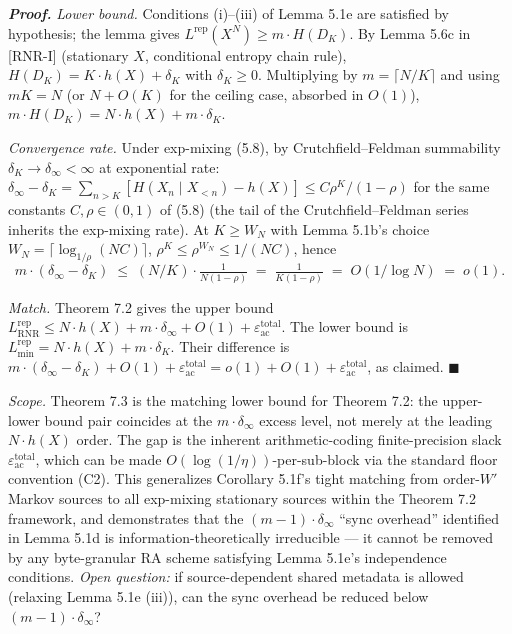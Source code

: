 \documentclass[
]{article}
\begin{document}
\emph{\textbf{Proof.}} \emph{Lower bound.} Conditions (i)--(iii) of
Lemma 5.1e are satisfied by hypothesis; the lemma gives
$L^{\mathrm{rep}}(X^N) \geq m \cdot H(D_K)$. By Lemma 5.6c in [RNR-I] (stationary
$X$, conditional entropy chain rule), $H(D_K) = K \cdot h(X) + \delta_K$
with $\delta_K \geq 0$. Multiplying by $m = \lceil N/K \rceil$ and
using $mK = N$ (or $N + O(K)$ for the ceiling case, absorbed in $O(1)$),
$m \cdot H(D_K) = N \cdot h(X) + m \cdot \delta_K$.

\emph{Convergence rate.} Under exp-mixing (5.8), by Crutchfield--Feldman
summability $\delta_K \to \delta_\infty < \infty$ at exponential rate:
$\delta_\infty - \delta_K = \sum_{n > K} [H(X_n \mid X_{<n}) - h(X)]
\leq C \rho^K / (1 - \rho)$ for the same constants $C, \rho \in (0, 1)$
of (5.8) (the tail of the Crutchfield--Feldman series inherits the
exp-mixing rate). At $K \geq W_N$ with Lemma 5.1b's choice
$W_N = \lceil \log_{1/\rho}(N C) \rceil$, $\rho^K \leq \rho^{W_N} \leq
1/(N C)$, hence
\[
m \cdot (\delta_\infty - \delta_K)
\;\leq\; (N/K) \cdot \tfrac{1}{N (1 - \rho)}
\;=\; \tfrac{1}{K (1 - \rho)}
\;=\; O(1/\log N) \;=\; o(1).
\]

\emph{Match.} Theorem 7.2 gives the upper bound
$L^{\mathrm{rep}}_{\mathrm{RNR}} \leq N \cdot h(X) + m \cdot \delta_\infty +
O(1) + \varepsilon_{\mathrm{ac}}^{\mathrm{total}}$. The lower bound is
$L^{\mathrm{rep}}_{\min} = N \cdot h(X) + m \cdot \delta_K$. Their
difference is $m \cdot (\delta_\infty - \delta_K) + O(1) +
\varepsilon_{\mathrm{ac}}^{\mathrm{total}} = o(1) + O(1) +
\varepsilon_{\mathrm{ac}}^{\mathrm{total}}$, as claimed.
\hfill$\blacksquare$

\emph{Scope.} Theorem 7.3 is the matching lower bound for Theorem 7.2:
the upper-lower bound pair coincides at the $m \cdot \delta_\infty$
excess level, not merely at the leading $N \cdot h(X)$ order. The
gap is the inherent arithmetic-coding finite-precision slack
$\varepsilon_{\mathrm{ac}}^{\mathrm{total}}$, which can be made
$O(\log(1/\eta))$-per-sub-block via the standard floor convention (C2).
This generalizes Corollary 5.1f's tight matching from order-$W'$
Markov sources to all exp-mixing stationary sources within the
Theorem 7.2 framework, and demonstrates that the
$(m-1) \cdot \delta_\infty$ ``sync overhead'' identified in Lemma 5.1d
is information-theoretically irreducible --- it cannot be removed by
any byte-granular RA scheme satisfying Lemma 5.1e's independence
conditions. \emph{Open question:} if source-dependent shared metadata
is allowed (relaxing Lemma 5.1e (iii)), can the sync overhead be
reduced below $(m-1) \cdot \delta_\infty$?
\end{document}
